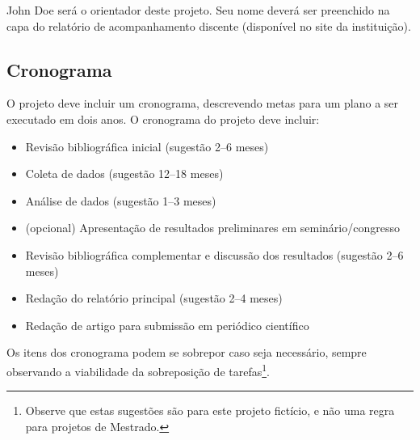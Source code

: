 \documentclass[a4paper]{article}
\begin{document}
John Doe será o orientador deste projeto. Seu nome deverá ser
preenchido na capa do relatório de acompanhamento discente (disponível
no site da instituição).

\subsection{Cronograma}

O projeto deve incluir um cronograma, descrevendo metas para um plano
a ser executado em dois anos. O cronograma do projeto deve incluir:

\begin{itemize}
\item Revisão bibliográfica inicial (sugestão 2--6 meses)
\item Coleta de dados (sugestão 12--18 meses)
\item Análise de dados (sugestão 1--3 meses)
\item (opcional) Apresentação de resultados preliminares em
  seminário/congresso
\item Revisão bibliográfica complementar e discussão dos resultados
  (sugestão 2--6 meses)
\item Redação do relatório principal (sugestão 2--4 meses)
\item Redação de artigo para submissão em periódico científico
\end{itemize}

Os itens dos cronograma podem se sobrepor caso seja necessário, sempre
observando a viabilidade da sobreposição de tarefas\footnote{Observe
  que estas sugestões são para este projeto fictício, e não uma regra
  para projetos de Mestrado.}.


\end{document}
